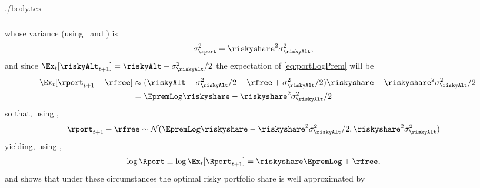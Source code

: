 \documentclass{handout}
\begin{document}
\begin{verbatimwrite}{./body.tex}
{\begin{equation}
\begin{gathered}
\begin{aligned}
\end{aligned}\end{gathered}\end{equation}
whose variance (using \SumNormsIsNorm~and \NormTimes) is
\begin{equation}\begin{gathered}\begin{aligned}
\sigma^{2}_{\rport} & =  \riskyshare^{2} \sigma^{2}_{\riskyAlt},   \label{rportVar}
\end{aligned}\end{gathered}\end{equation}
and since $\Ex_{t}[\riskyAlt_{t+1}]=\riskyAlt-\sigma^{2}_{\riskyAlt}/2$ the expectation of \eqref{eq:portLogPrem} 
will be
\begin{equation}\begin{gathered}\begin{aligned} 
    \Ex_{t}[\rport_{t+1}-\rfree] & \approx  (\riskyAlt- \sigma^{2}_{\riskyAlt}/2 - \rfree + \sigma^{2}_{\riskyAlt}/2)\riskyshare-\riskyshare^{2}\sigma^{2}_{\riskyAlt}/2
\\   & =   \EpremLog \riskyshare -\riskyshare^{2}\sigma^{2}_{\riskyAlt}/2
\end{aligned}\end{gathered}\end{equation}
so that, using \SumNormsIsNorm,
\begin{equation}\begin{gathered}\begin{aligned}
  \rport_{t+1}-\rfree & \sim  \mathcal{N}(\EpremLog \riskyshare -\riskyshare^{2}\sigma^{2}_{\riskyAlt}/2,\riskyshare^{2}\sigma^{2}_{\riskyAlt}) \label{eq:rportDist}
\end{aligned}\end{gathered}\end{equation}
yielding, using \LogELogNormTimes, }
\begin{equation}\begin{gathered}\begin{aligned}
 \log \Rport \equiv \log \Ex_{t}[\Rport_{t+1}] & =  \riskyshare \EpremLog + \rfree \label{LogERport},
\end{aligned}\end{gathered}\end{equation}
and  shows that under these circumstances the optimal risky
portfolio share is well approximated by
\begin{equation}\begin{gathered}\begin{aligned}

\end{aligned}
\end{gathered}
\end{equation}
\end{verbatimwrite}
\end{document}
